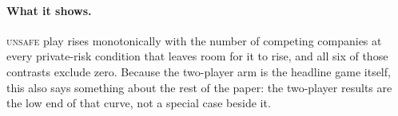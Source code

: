 \documentclass{article}
\newcommand{\Unsafe}{\textsc{unsafe}}
\newcommand{\Description}[1]{}
\begin{document}

\paragraph{What it shows.} \Unsafe{} play rises monotonically with the number
of competing companies at every private-risk condition that leaves room for it
to rise, and all six of those contrasts exclude zero. Because the two-player
arm is the headline game itself, this also says something about the rest of the
paper: the two-player results are the low end of that curve, not a special case
beside it.
\end{document}
